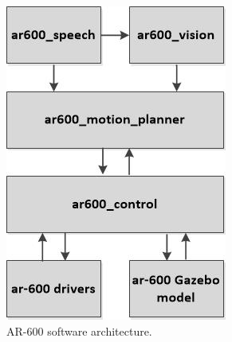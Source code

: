 \documentclass[letterpaper, 10 pt, conference]{ieeeconf}  %
\begin{document}
\begin{figure}[thpb]
\centering

\includegraphics[scale=.75]{software}
\caption{AR-600 software architecture.}
\label{img:software}
\end{figure}
\end{document}
